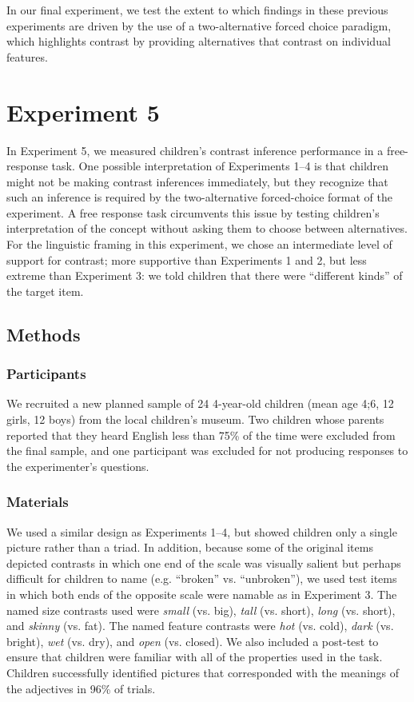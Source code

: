 \documentclass[man]{apa2}
\begin{document}
In our final experiment, we test the extent to which findings in these previous experiments are driven by the use of a two-alternative forced choice paradigm, which highlights contrast by providing alternatives that contrast on individual features.

\section{Experiment 5} 

In Experiment 5, we measured children's contrast inference performance in a free-response task. One possible interpretation of Experiments 1--4 is that children might not be making contrast inferences immediately, but they recognize that such an inference is required by the two-alternative forced-choice format of the experiment. A free response task circumvents this issue by testing children's interpretation of the concept without asking them to choose between alternatives. For the linguistic framing in this experiment, we chose an intermediate level of support for contrast; more supportive than Experiments 1 and 2, but less extreme than Experiment 3: we told children that there were ``different kinds'' of the target item.

\subsection{Methods}

\subsubsection{Participants}

We recruited a new planned sample of 24 4-year-old children (mean age 4;6, 12 girls, 12 boys) from the local children's museum.  Two children whose parents reported that they heard English less than 75\% of the time were excluded from the final sample, and one participant was excluded for not producing responses to the experimenter's questions.

\subsubsection{Materials}

We used a similar design as Experiments 1--4, but showed children only a single picture rather than a triad.  In addition, because some of the original items depicted contrasts in which one end of the scale was visually salient but perhaps difficult for children to name (e.g. ``broken'' vs. ``unbroken''), we used test items in which both ends of the opposite scale were namable as in Experiment 3. The named size contrasts used were \emph{small} (vs. big), \emph{tall} (vs. short), \emph{long} (vs. short), and \emph{skinny} (vs. fat).  The named feature contrasts were \emph{hot} (vs. cold), \emph{dark} (vs. bright), \emph{wet} (vs. dry), and \emph{open} (vs. closed).  We also included a post-test to ensure that children were familiar with all of the properties used in the task.  Children successfully identified pictures that corresponded with the meanings of the adjectives in 96\% of trials.
\end{document}
